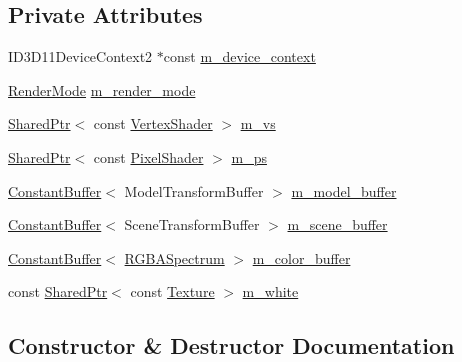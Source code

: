\subsection*{Private Attributes}
\begin{DoxyCompactItemize}
\item 
I\+D3\+D11\+Device\+Context2 $\ast$const \hyperlink{classmage_1_1_variable_component_pass_a12a0f59a371c46377af9032744a6e71b}{m\+\_\+device\+\_\+context}
\item 
\hyperlink{namespacemage_a5e7e18b0154373ce8fc942fe3f6b27fd}{Render\+Mode} \hyperlink{classmage_1_1_variable_component_pass_a6e9a67c5251951f887d64c1a6d50a33c}{m\+\_\+render\+\_\+mode}
\item 
\hyperlink{namespacemage_a1e01ae66713838a7a67d30e44c67703e}{Shared\+Ptr}$<$ const \hyperlink{classmage_1_1_vertex_shader}{Vertex\+Shader} $>$ \hyperlink{classmage_1_1_variable_component_pass_afc290392240d6e9af2ba3027b992f53d}{m\+\_\+vs}
\item 
\hyperlink{namespacemage_a1e01ae66713838a7a67d30e44c67703e}{Shared\+Ptr}$<$ const \hyperlink{namespacemage_ac98506b7edd999ea43ec46fbd0330238}{Pixel\+Shader} $>$ \hyperlink{classmage_1_1_variable_component_pass_a20d7e3c6b663544b84871f519284db2c}{m\+\_\+ps}
\item 
\hyperlink{structmage_1_1_constant_buffer}{Constant\+Buffer}$<$ Model\+Transform\+Buffer $>$ \hyperlink{classmage_1_1_variable_component_pass_a3313fa671047d02a9c9b85fea85f545d}{m\+\_\+model\+\_\+buffer}
\item 
\hyperlink{structmage_1_1_constant_buffer}{Constant\+Buffer}$<$ Scene\+Transform\+Buffer $>$ \hyperlink{classmage_1_1_variable_component_pass_a80eb6a13a4bb5ce8ca197a3a8eddd061}{m\+\_\+scene\+\_\+buffer}
\item 
\hyperlink{structmage_1_1_constant_buffer}{Constant\+Buffer}$<$ \hyperlink{structmage_1_1_r_g_b_a_spectrum}{R\+G\+B\+A\+Spectrum} $>$ \hyperlink{classmage_1_1_variable_component_pass_a5ad5ee6588063683cacf4ad3aac055bc}{m\+\_\+color\+\_\+buffer}
\item 
const \hyperlink{namespacemage_a1e01ae66713838a7a67d30e44c67703e}{Shared\+Ptr}$<$ const \hyperlink{classmage_1_1_texture}{Texture} $>$ \hyperlink{classmage_1_1_variable_component_pass_a2b018f6481e6e5aa043223ce6821725d}{m\+\_\+white}
\end{DoxyCompactItemize}


\subsection{Constructor \& Destructor Documentation}
\hypertarget{classmage_1_1_variable_component_pass_a86224a1702761665451b3c6e78557261}{}\label{classmage_1_1_variable_component_pass_a86224a1702761665451b3c6e78557261} 
